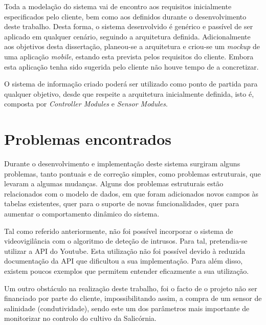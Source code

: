 Toda a modelação do sistema vai de encontro aos requisitos inicialmente especificados pelo cliente, bem como aos definidos durante o desenvolvimento deste trabalho. Desta forma, o sistema desenvolvido é genérico e passível de ser aplicado em qualquer cenário, seguindo a arquitetura definida. Adicionalmente aos objetivos desta dissertação, planeou-se a arquitetura e criou-se um \textit{mockup} de uma aplicação \textit{mobile}, estando esta prevista pelos requisitos do cliente. Embora esta aplicação tenha sido sugerida pelo cliente não houve tempo de a concretizar. 


O sistema de informação criado poderá ser utilizado como ponto de partida para qualquer objetivo, desde que respeite a arquitetura inicialmente definida, isto é, composta por \textit{Controller Modules} e \textit{Sensor Modules}. 

\section{Problemas encontrados}


Durante o desenvolvimento e implementação deste sistema surgiram alguns problemas, tanto pontuais e de correção simples, como
problemas estruturais, que levaram a algumas mudanças. Alguns dos problemas estruturais estão relacionados com o modelo de dados, em que foram adicionados novos campos às tabelas existentes, quer para o suporte de novas funcionalidades, quer para aumentar o comportamento dinâmico do sistema.


Tal como referido anteriormente, não foi possível incorporar o sistema de videovigilância com o algoritmo de deteção de intrusos. Para tal, pretendia-se utilizar a \ac{API} do Youtube. Esta utilização não foi possível devido à reduzida documentação da \ac{API} que dificultou a sua implementação. Para além disso, existem poucos exemplos que permitem entender eficazmente a sua utilização. 

Um outro obstáculo na realização deste trabalho, foi o facto de o projeto não ser financiado por parte do cliente, impossibilitando assim, a compra de um sensor de salinidade (condutividade), sendo este um dos parâmetros mais importante de monitorizar no controlo do cultivo da Salicórnia. 







